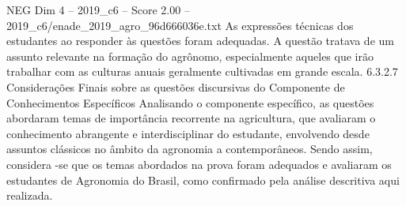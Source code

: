 \begin{textsample}{NEG Dim 4 – 2019\_c6 – Score 2.00 – 2019\_c6/enade\_2019\_agro\_96d666036e.txt}
As expressões técnicas dos estudantes ao responder às questões foram adequadas.
A questão tratava de um assunto relevante na formação do agrônomo, especialmente aqueles que irão trabalhar com as culturas anuais geralmente cultivadas em grande escala. 6.3.2.7 Considerações Finais sobre as questões discursivas do Componente de Conhecimentos Específicos Analisando o componente específico, as questões abordaram temas de importância recorrente na agricultura, que avaliaram o conhecimento abrangente e interdisciplinar do estudante, envolvendo desde assuntos clássicos no âmbito da agronomia a contemporâneos.
Sendo assim, considera -se que os temas abordados na prova foram adequados e avaliaram os estudantes de Agronomia do Brasil, como confirmado pela análise descritiva aqui realizada.

\end{textsample}
